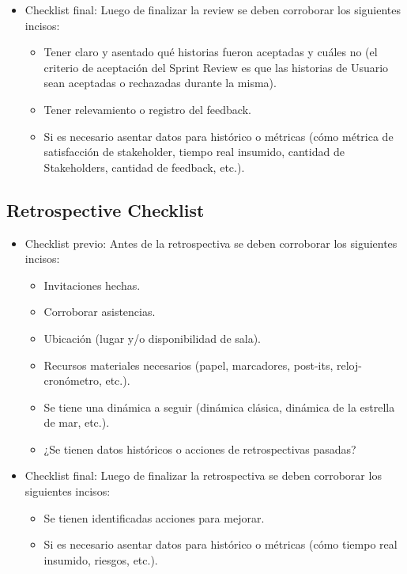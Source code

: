 \begin{itemize}
{\begin{itemize}
  \end{itemize}
  }
  
  \item {Checklist final: Luego de finalizar la review se deben corroborar los siguientes incisos:
    \begin{itemize}
      \item Tener claro y asentado qué historias fueron aceptadas y cuáles no (el criterio de aceptación del Sprint Review es que las historias de Usuario sean aceptadas o rechazadas durante la misma).
      \item Tener relevamiento o registro del feedback.
      \item Si es necesario asentar datos para histórico o métricas (cómo métrica de satisfacción de stakeholder, tiempo real insumido, cantidad de Stakeholders, cantidad de feedback, etc.).
   \end{itemize}
  }

\end{itemize}

\subsection{Retrospective Checklist}

\begin{itemize}
  
  \item {Checklist previo: Antes de la retrospectiva se deben corroborar los siguientes incisos:
  
  \begin{itemize}
    \item Invitaciones hechas.
    \item Corroborar asistencias.
    \item Ubicación (lugar y/o disponibilidad de sala).
    \item Recursos materiales necesarios (papel, marcadores, post-its, reloj-cronómetro, etc.).
    \item Se tiene una dinámica a seguir (dinámica clásica, dinámica de la estrella de mar, etc.).
    \item ¿Se tienen datos históricos o acciones de retrospectivas pasadas?

  \end{itemize}
  }
  
  \item {Checklist final: Luego de finalizar la retrospectiva se deben corroborar los siguientes incisos:
    \begin{itemize}
      \item Se tienen identificadas acciones para mejorar.
      \item Si es necesario asentar datos para histórico o métricas (cómo tiempo real insumido, riesgos, etc.).
   \end{itemize}
  }

\end{itemize}
